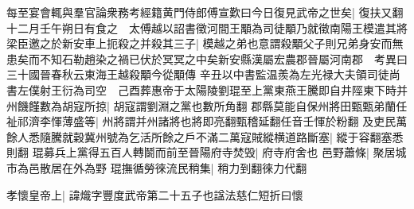 每至宴會輒與羣官論衆務考經籍黄門侍郎傅宣歎曰今日復見武帝之世矣|{
	復扶又翻}
十二月壬午朔日有食之　太傅越以詔書徵河間王顒為司徒顒乃就徵南陽王模遣其將梁臣邀之於新安車上扼殺之并殺其三子|{
	模越之弟也意謂殺顒父子則兄弟身安而無患矣而不知石勒趙染之禍已伏於冥冥之中矣新安縣漢屬宏農郡晉屬河南郡　考異曰三十國晉春秋云東海王越殺顒今從顒傳}
辛丑以中書監温羨為左光禄大夫領司徒尚書左僕射王衍為司空　己酉葬惠帝于太陽陵劉琨至上黨東燕王騰即自井陘東下時并州饑饉數為胡寇所掠|{
	胡寇謂劉淵之黨也數所角翻}
郡縣莫能自保州將田甄甄弟蘭任祉祁濟李惲薄盛等|{
	州將謂并州諸將也將即亮翻甄稽延翻任音壬惲於粉翻}
及吏民萬餘人悉隨騰就穀冀州號為乞活所餘之戶不滿二萬寇賊縱横道路斷塞|{
	縱于容翻塞悉則翻}
琨募兵上黨得五百人轉鬬而前至晉陽府寺焚毁|{
	府寺府舍也}
邑野蕭條|{
	聚居城市為邑散居在外為野}
琨撫循勞徠流民稍集|{
	稍力到翻徠力代翻}


孝懷皇帝上|{
	諱熾字豐度武帝第二十五子也諡法慈仁短折曰懷}


